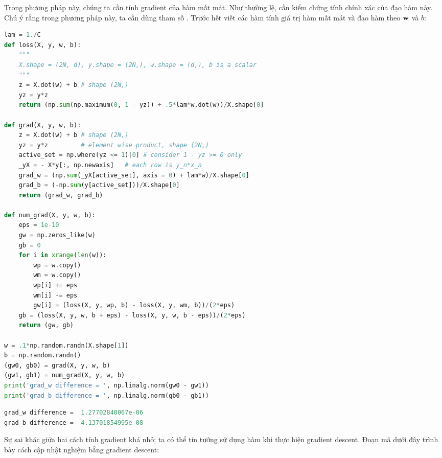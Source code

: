 Trong phương pháp này, chúng ta cần tính gradient của hàm mất mát. Như thường lệ, cần kiểm chứng tính chính xác của đạo hàm này.
Chú ý rằng trong phương pháp này, ta cần dùng tham số .
Trước hết viết các hàm tính giá trị hàm mất mát và đạo hàm theo $\mathbf{w}$ và $b$:
\newpage
\begin{lstlisting}[language=Python]
lam = 1./C
def loss(X, y, w, b):
    """
    X.shape = (2N, d), y.shape = (2N,), w.shape = (d,), b is a scalar
    """
    z = X.dot(w) + b # shape (2N,)
    yz = y*z
    return (np.sum(np.maximum(0, 1 - yz)) + .5*lam*w.dot(w))/X.shape[0]

def grad(X, y, w, b):
    z = X.dot(w) + b # shape (2N,)
    yz = y*z         # element wise product, shape (2N,)
    active_set = np.where(yz <= 1)[0] # consider 1 - yz >= 0 only
    _yX = - X*y[:, np.newaxis]   # each row is y_n*x_n
    grad_w = (np.sum(_yX[active_set], axis = 0) + lam*w)/X.shape[0]
    grad_b = (-np.sum(y[active_set]))/X.shape[0]
    return (grad_w, grad_b)

def num_grad(X, y, w, b):
    eps = 1e-10
    gw = np.zeros_like(w)
    gb = 0
    for i in xrange(len(w)):
        wp = w.copy()
        wm = w.copy()
        wp[i] += eps
        wm[i] -= eps
        gw[i] = (loss(X, y, wp, b) - loss(X, y, wm, b))/(2*eps)
    gb = (loss(X, y, w, b + eps) - loss(X, y, w, b - eps))/(2*eps)
    return (gw, gb)

w = .1*np.random.randn(X.shape[1])
b = np.random.randn()
(gw0, gb0) = grad(X, y, w, b)
(gw1, gb1) = num_grad(X, y, w, b)
print('grad_w difference = ', np.linalg.norm(gw0 - gw1))
print('grad_b difference = ', np.linalg.norm(gb0 - gb1))
\end{lstlisting}
\kq
\begin{lstlisting}[language=Python]
grad_w difference =  1.27702840067e-06
grad_b difference =  4.13701854995e-08
\end{lstlisting}
Sự sai khác giữa hai cách tính gradient khá nhỏ; ta có thể tin tưởng sử dụng hàm
 khi thực hiện gradient descent.
\newpage
Đoạn mã dưới đây trình bày cách cập nhật nghiệm bằng gradient descent:
